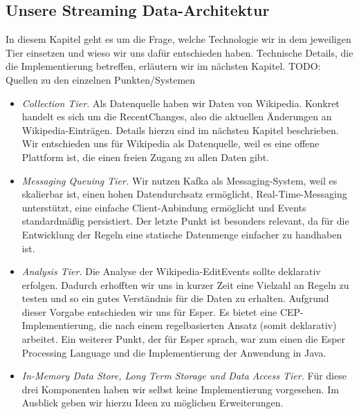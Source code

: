 \subsection{Unsere Streaming Data-Architektur}
In diesem Kapitel geht es um die Frage, welche Technologie wir in dem jeweiligen Tier einsetzen und wieso wir uns dafür entschieden haben.
Technische Details, die die Implementierung betreffen, erläutern wir im nächsten Kapitel.
TODO: Quellen zu den einzelnen Punkten/Systemen
\begin{itemize}
    \item \textit{Collection Tier.} Als Datenquelle haben wir Daten von Wikipedia. Konkret handelt es sich um die RecentChanges,
    also die aktuellen Änderungen an Wikipedia-Einträgen. Details hierzu sind im nächsten Kapitel beschrieben. Wir entschieden uns für Wikipedia als
    Datenquelle, weil es eine offene Plattform ist, die einen freien Zugang zu allen Daten gibt.

    \item \textit{Messaging Queuing Tier.} Wir nutzen Kafka als Messaging-System, weil es skalierbar ist, einen hohen Datendurchsatz ermöglicht,
    Real-Time-Messaging unterstützt, eine einfache Client-Anbindung ermöglicht und Events standardmäßig persistiert. Der letzte Punkt ist
    besonders relevant, da für die Entwicklung der Regeln eine statische Datenmenge einfacher zu handhaben ist.

    \item \textit{Analysis Tier.} Die Analyse der Wikipedia-EditEvents sollte deklarativ erfolgen. Dadurch erhofften wir uns
    in kurzer Zeit eine Vielzahl an Regeln zu testen und so ein gutes Verständnis für die Daten zu erhalten. Aufgrund dieser Vorgabe
    entschieden wir uns für Esper. Es bietet eine CEP-Implementierung, die nach einem regelbasierten Ansatz (somit deklarativ) arbeitet.
    Ein weiterer Punkt, der für Esper sprach, war zum einen die Esper Processing Language und die Implementierung der Anwendung in Java.

    \item \textit{In-Memory Data Store, Long Term Storage und Data Access Tier.} Für diese drei Komponenten haben wir selbst keine Implementierung vorgesehen.
    Im Ausblick geben wir hierzu Ideen zu möglichen Erweiterungen.
\end{itemize}